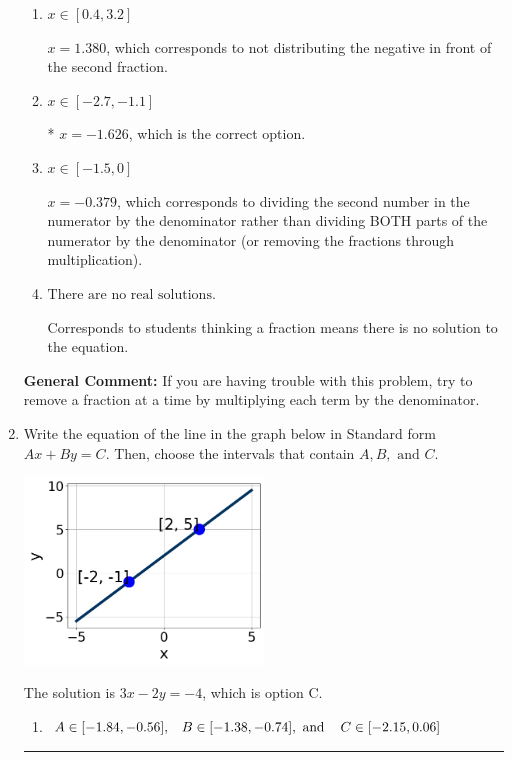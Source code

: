 \documentclass{extbook}[14pt]
\newcommand{\litem}[1]{\item #1

\rule{\textwidth}{0.4pt}}
\begin{document}
\begin{enumerate}
{\begin{enumerate}[label=\Alph*.]
 $x = -5.153$, which corresponds to dividing the coefficients in front of x by the denominator rather than dividing BOTH parts of the numerator by the denominator (or removing the fractions through multiplication).
\item \( x \in [0.4, 3.2] \)

 $x = 1.380$, which corresponds to not distributing the negative in front of the second fraction.
\item \( x \in [-2.7, -1.1] \)

* $x = -1.626$, which is the correct option.
\item \( x \in [-1.5, 0] \)

 $x = -0.379$, which corresponds to dividing the second number in the numerator by the denominator rather than dividing BOTH parts of the numerator by the denominator (or removing the fractions through multiplication).
\item \( \text{There are no real solutions.} \)

Corresponds to students thinking a fraction means there is no solution to the equation.
\end{enumerate}

\textbf{General Comment:} If you are having trouble with this problem, try to remove a fraction at a time by multiplying each term by the denominator.
}
\litem{
Write the equation of the line in the graph below in Standard form $Ax+By=C$. Then, choose the intervals that contain $A, B, \text{ and } C$.

\begin{center}
    \includegraphics[width=0.5\textwidth]{../Figures/linearGraphToStandardCopyA.png}
\end{center}



The solution is \( 3x - 2y = -4 \), which is option C.\begin{enumerate}[label=\Alph*.]
\item \( A \in [-1.84, -0.56], \hspace{3mm} B \in [-1.38, -0.74], \text{ and } \hspace{3mm} C \in [-2.15, 0.06] \)


\end{enumerate}}
\end{enumerate}
\end{document}
